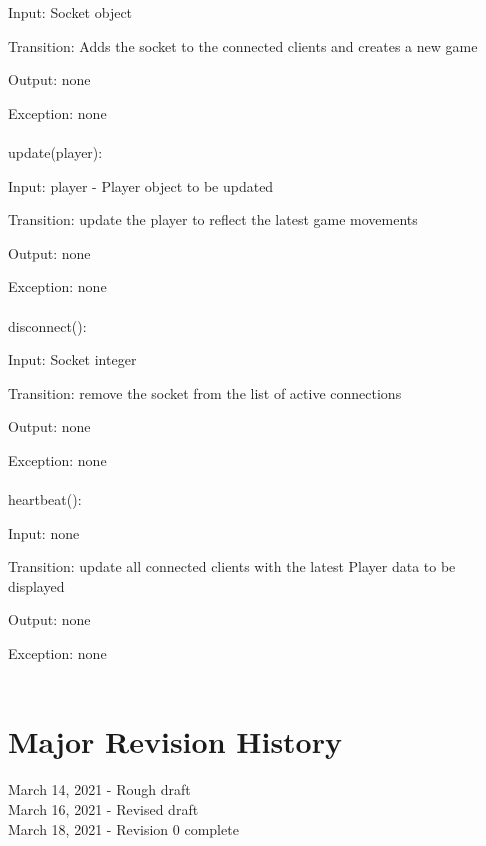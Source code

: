 \documentclass[12,english]{article}
\begin{document}
		Input: Socket object  
		
		Transition: Adds the socket to the connected clients and creates a new game
		
		Output: none
		
		Exception: none\\
		\\		
		update(player):

		Input: player - Player object to be updated
		
		Transition: update the player to reflect the latest game movements
		
		Output: none
		
		Exception: none\\
		\\		
		disconnect():

		Input: Socket integer
		
		Transition: remove the socket from the list of active connections
		
		Output: none
		
		Exception: none\\
		\\
		heartbeat():

		Input: none
		
		Transition: update all connected clients with the latest Player data to be displayed
		
		Output: none
		
		Exception: none\\
		\\		
\textbf{}
\section{Major Revision History}
March 14, 2021 - Rough draft\\
March 16, 2021 - Revised draft \\
March 18, 2021 - Revision 0 complete

			
\end{document}
